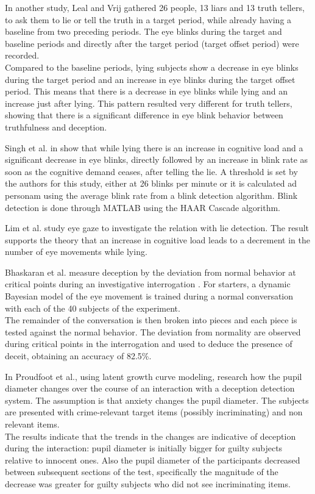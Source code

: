 In another study, Leal and Vrij \cite{Leal2008} gathered 26 people, 13 liars and 13 truth tellers, to ask them to lie or tell the truth in a target period, while already having a baseline from two preceding periods. The eye blinks during the target and baseline periods and directly after the target period (target offset period) were recorded.\\
Compared to the baseline periods, lying subjects show a decrease in eye blinks during the target period and an increase in eye blinks during the target offset period. This means that there is a decrease in eye blinks while lying and an increase just after lying. This pattern resulted very different for truth tellers, showing that there is a significant difference in eye blink behavior between truthfulness and deception.

Singh et al. in \cite{7324092} show that while lying there is an increase in cognitive load and a significant decrease in eye blinks, directly followed by an increase in blink rate as soon as the cognitive demand ceases, after telling the lie. A threshold is set by the authors for this study, either at 26 blinks per minute or it is calculated ad personam using the average blink rate from a blink detection algorithm. Blink detection is done through MATLAB using the HAAR Cascade algorithm.

Lim et al. study eye gaze \cite{Lim:2013:LTE:2535948.2535954} to investigate the relation with lie detection. The result supports the theory that an increase in cognitive load leads to a decrement in the number of eye movements while lying.

Bhaskaran et al. measure deception by the deviation from normal behavior at critical points during an investigative interrogation \cite{5771407} . For starters, a dynamic Bayesian model of the eye movement is trained during a normal conversation with each of the 40 subjects of the experiment. \\
The remainder of the conversation is then broken into pieces and each piece is tested against the normal behavior. The deviation from normality are observed during critical points in the interrogation and used to deduce the presence of deceit, obtaining an accuracy of 82.5\%.

In \cite{7165946} Proudfoot et al., using latent growth curve modeling, research how the pupil diameter changes over the course of an interaction with a deception detection system. The assumption is that anxiety changes the pupil diameter. The subjects are presented with crime-relevant target items (possibly incriminating) and non relevant items. \\
The results indicate that the trends in the changes are indicative of deception during the interaction: pupil diameter is initially bigger for guilty subjects relative to innocent ones. Also the pupil diameter of the participants decreased between subsequent sections of the test, specifically the magnitude of the decrease was greater for guilty subjects who did not see incriminating items.

